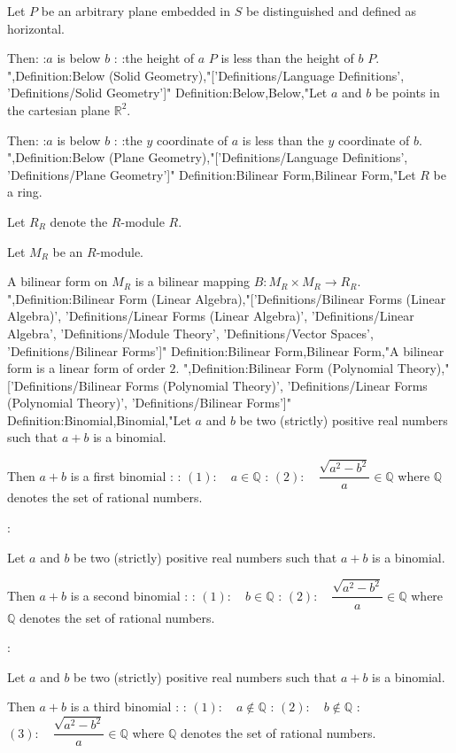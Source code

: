 Let $P$ be an arbitrary plane embedded in $S$ be distinguished and defined as horizontal.

Then:
:$a$ is below $b$
:
:the height of $a$  $P$ is less than the height of $b$  $P$.
",Definition:Below (Solid Geometry),"['Definitions/Language Definitions', 'Definitions/Solid Geometry']"
Definition:Below,Below,"Let $a$ and $b$ be points in the cartesian plane $\mathbb R^2$.

Then:
:$a$ is below $b$
:
:the $y$ coordinate of $a$ is less than the $y$ coordinate of $b$.
",Definition:Below (Plane Geometry),"['Definitions/Language Definitions', 'Definitions/Plane Geometry']"
Definition:Bilinear Form,Bilinear Form,"Let $R$ be a ring.

Let $R_R$ denote the $R$-module $R$.

Let $M_R$ be an $R$-module.


A bilinear form on $M_R$ is a bilinear mapping $B : M_R \times M_R \to R_R$.
",Definition:Bilinear Form (Linear Algebra),"['Definitions/Bilinear Forms (Linear Algebra)', 'Definitions/Linear Forms (Linear Algebra)', 'Definitions/Linear Algebra', 'Definitions/Module Theory', 'Definitions/Vector Spaces', 'Definitions/Bilinear Forms']"
Definition:Bilinear Form,Bilinear Form,"A bilinear form is a linear form of order $2$.
",Definition:Bilinear Form (Polynomial Theory),"['Definitions/Bilinear Forms (Polynomial Theory)', 'Definitions/Linear Forms (Polynomial Theory)', 'Definitions/Bilinear Forms']"
Definition:Binomial,Binomial,"Let $a$ and $b$ be two (strictly) positive real numbers such that $a + b$ is a binomial.


Then $a + b$ is a first binomial :
: $(1): \quad a \in \mathbb Q$
: $(2): \quad \dfrac {\sqrt {a^2 - b^2} } a \in \mathbb Q$
where $\mathbb Q$ denotes the set of rational numbers.



:

Let $a$ and $b$ be two (strictly) positive real numbers such that $a + b$ is a binomial.


Then $a + b$ is a second binomial :
: $(1): \quad b \in \mathbb Q$
: $(2): \quad \dfrac {\sqrt {a^2 - b^2}} a \in \mathbb Q$
where $\mathbb Q$ denotes the set of rational numbers.



:

Let $a$ and $b$ be two (strictly) positive real numbers such that $a + b$ is a binomial.


Then $a + b$ is a third binomial :
: $(1): \quad a \notin \mathbb Q$
: $(2): \quad b \notin \mathbb Q$
: $(3): \quad \dfrac {\sqrt {a^2 - b^2}} a \in \mathbb Q$
where $\mathbb Q$ denotes the set of rational numbers.



